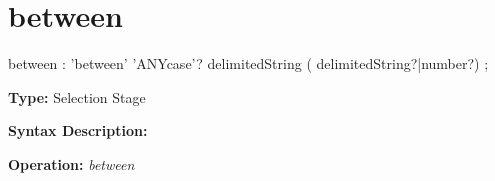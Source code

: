 \section{between}
\begin{shaded}
\begin{rail}
  between : 'between' 'ANYcase'? delimitedString ( delimitedString?|number?)
  ;
\end{rail}
\end{shaded}

\textbf{Type:} Selection Stage

\textbf{Syntax Description:}


\textbf{Operation:}  \emph{between}

%  

